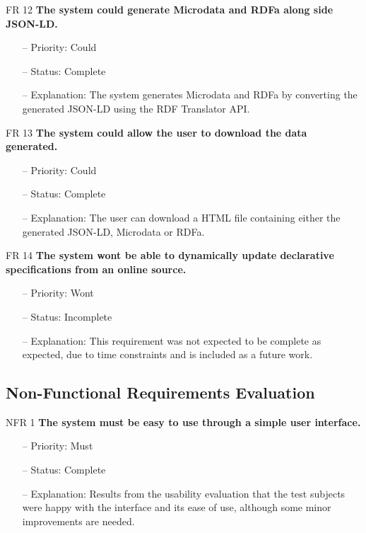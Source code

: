 \newpage
\noindent
FR 12 \textbf{The system could generate Microdata and RDFa along side JSON-LD.}
\begin{itemize}
\item[--] Priority: Could
\item[--] Status: Complete
\item[--] Explanation: The system generates Microdata and RDFa by converting the generated JSON-LD using the RDF Translator API.
\end{itemize}
\noindent
FR 13 \textbf{The system could allow the user to download the data generated.}
\begin{itemize}
\item[--] Priority: Could
\item[--] Status: Complete
\item[--] Explanation: The user can download a HTML file containing either the generated JSON-LD, Microdata or RDFa.
\end{itemize}
FR 14 \textbf{The system wont be able to dynamically update declarative specifications from an online source.}
\begin{itemize}
\item[--] Priority: Wont
\item[--] Status: Incomplete
\item[--] Explanation: This requirement was not expected to be complete as expected, due to time constraints and is included as a future work.
\end{itemize}

\subsection{Non-Functional Requirements Evaluation}
\noindent
NFR 1 \textbf{The system must be easy to use through a simple user interface.}
\begin{itemize}
\item[--] Priority: Must
\item[--] Status: Complete
\item[--] Explanation: Results from the usability evaluation that the test subjects were happy with the interface and its ease of use, although some minor improvements are needed.
\end{itemize}

